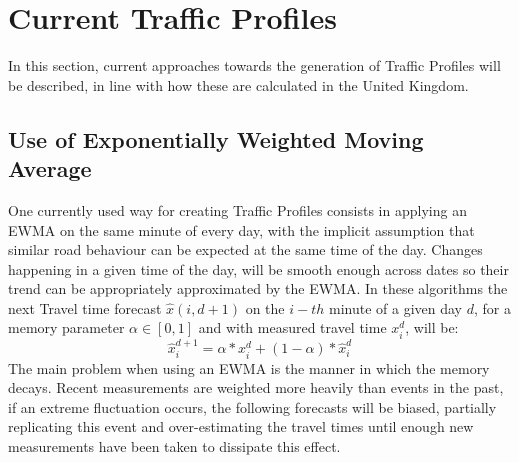 \documentclass[conference, letterpaper]{IEEEtran}
\begin{document}
\section{Current Traffic Profiles}
In this section, current approaches towards the generation of Traffic Profiles will be described, in line with how these are calculated in the United Kingdom.
\subsection{Use of Exponentially Weighted Moving Average} \label{ewma}
One currently used way for creating Traffic Profiles consists in applying an EWMA on the same minute of every day, with the implicit assumption that similar road behaviour can be expected at the same time of the day. 
Changes happening in a given time of the day, will be smooth enough across dates so their trend can be appropriately approximated by the EWMA.
In these algorithms the next Travel time forecast $\hat{x}(i,d+1)$ on the $i-th$ minute of a given day $d$, for a memory parameter $\alpha \in [0,1]$ and with measured travel time $x_i^d$, will be:
\begin{equation}
\hat{x}^{d+1}_i = \alpha * x^{d}_{i} + (1-\alpha)*\hat{x}^{d}_{i}
\end{equation}
The main problem when using an EWMA is the manner in which the memory decays. 
Recent measurements are weighted more heavily than events in the past, if an extreme fluctuation occurs, the following forecasts will be biased, partially replicating this event and over-estimating the travel times until enough new measurements have been taken to dissipate this effect.
\end{document}
